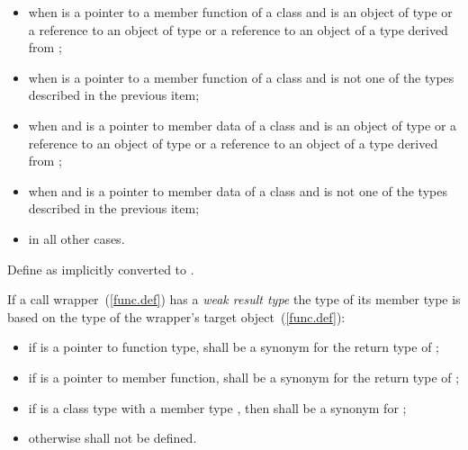 \begin{itemize}
\item {} when  is a pointer to a
member function of a class  and  is an object of
type  or a reference to an object of type  or a
reference to an object of a type derived from ;

\item {} when  is a pointer to a
member function of a class  and  is not one of the
types described in the previous item;

\item {} when  and
 is a pointer to member data of a
class  and  is an object of type  or a
reference to an object of type  or a reference to an object
of a type derived from ;

\item {} when  and
 is a pointer to member data of a
class  and  is not one of the types described in
the previous item;

\item {} in all other cases.
\end{itemize}

\pnum
{}%
Define  as
 implicitly converted
to .

\pnum
{}%
%
%
If a call wrapper~(\ref{func.def}) has a \textit{weak result type}
the type of its member type  is based on the
type  of the wrapper's target object~(\ref{func.def}):
\begin{itemize}
\item
if  is a pointer to
function type,  shall be a synonym for the return
type of ;

\item
if  is a pointer to member function, 
shall be a synonym for the return type of ;

\item
if  is a class type with a member type ,
then  shall be a synonym for ;

\item
otherwise  shall not be defined.
\end{itemize}

